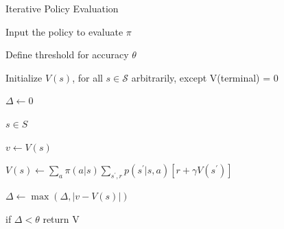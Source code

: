 \documentclass{beamer}
\begin{document}
\begin{frame}{Iterative Policy Evaluation}


\begin{algorithm}[H]
\caption{Iterative Policy Evaluation}


\vspace{1mm}
Input the policy to evaluate $\pi$

\vspace{0.5mm}

Define threshold for accuracy $\theta$

\vspace{0.5mm}

Initialize $V(s)$, for all $s \in \mathcal{S}$ arbitrarily, except V(terminal) = 0

\vspace{4mm}

$\Delta \leftarrow 0$
 

 \textbf{}  

 \hspace{5mm}  \textbf{}  $s \in S$
   
   \vspace{0.5mm}
   
   \hspace{15mm} $v \leftarrow V(s)$
   
   \vspace{0.7mm}
   
   \hspace{15mm} $V(s) \leftarrow \sum_{a} \pi(a|s) \sum_{s^{\prime}, r} p(s^{\prime}| s, a)[r + \gamma V(s^{\prime})]$
   
   \vspace{0.7mm}
   
   \hspace{15mm} $\Delta \leftarrow \max(\Delta, |v - V(s)|)$
   
   \vspace{0.5mm}
   
   \hspace{5mm} if $\Delta < \theta$ return V
   \vspace{1mm}
   

\end{algorithm}

\end{frame}
\end{document}
